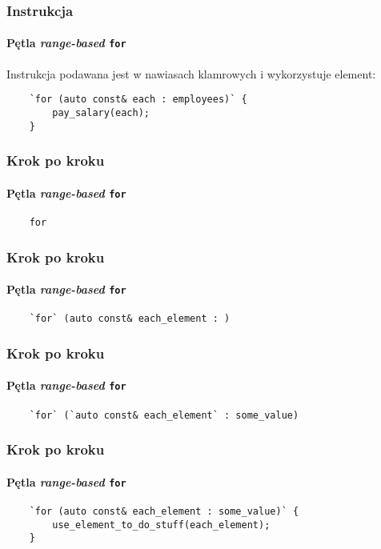 \documentclass[aspectratio=169]{beamer}
\begin{document}
\begin{frame}[fragile]
    \frametitle{Instrukcja}
    \framesubtitle{Pętla \emph{range-based} {\tt for}}

    Instrukcja podawana jest w nawiasach klamrowych i wykorzystuje element:

    \begin{lstlisting}
    `for (auto const& each : employees)` {
        pay_salary(each);
    }
    \end{lstlisting}
\end{frame}

\begin{frame}[fragile]
    \frametitle{Krok po kroku}
    \framesubtitle{Pętla \emph{range-based} {\tt for}}

    \begin{lstlisting}
    for
    \end{lstlisting}
    \vspace{2.4em}
\end{frame}

\begin{frame}[fragile]
    \frametitle{Krok po kroku}
    \framesubtitle{Pętla \emph{range-based} {\tt for}}

    \begin{lstlisting}
    `for` (auto const& each_element : )
    \end{lstlisting}
    \vspace{2.4em}
\end{frame}

\begin{frame}[fragile]
    \frametitle{Krok po kroku}
    \framesubtitle{Pętla \emph{range-based} {\tt for}}

    \begin{lstlisting}
    `for` (`auto const& each_element` : some_value)
    \end{lstlisting}
    \vspace{2.4em}
\end{frame}

\begin{frame}[fragile]
    \frametitle{Krok po kroku}
    \framesubtitle{Pętla \emph{range-based} {\tt for}}

    \begin{lstlisting}
    `for (auto const& each_element : some_value)` {
        use_element_to_do_stuff(each_element);
    }
    \end{lstlisting}
\end{frame}
\end{document}
